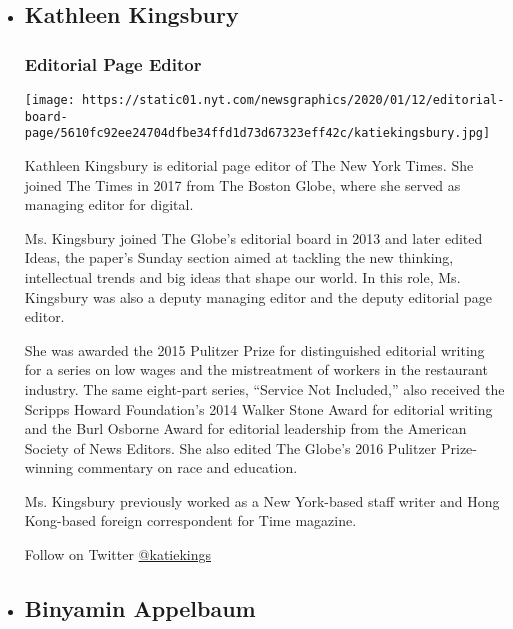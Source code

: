 \begin{itemize}
\item
  \hypertarget{kathleen-kingsbury}{%
  \subsection{Kathleen Kingsbury}\label{kathleen-kingsbury}}

  \hypertarget{editorial-page-editor}{%
  \subsubsection{Editorial Page Editor}\label{editorial-page-editor}}

  \texttt{[image: https://static01.nyt.com/newsgraphics/2020/01/12/editorial-board-page/5610fc92ee24704dfbe34ffd1d73d67323eff42c/katiekingsbury.jpg]}

  Kathleen Kingsbury is editorial page editor of The New York Times. She
  joined The Times in 2017 from The Boston Globe, where she served as
  managing editor for digital.

  Ms. Kingsbury joined The Globe's editorial board in 2013 and later
  edited Ideas, the paper's Sunday section aimed at tackling the new
  thinking, intellectual trends and big ideas that shape our world. In
  this role, Ms. Kingsbury was also a deputy managing editor and the
  deputy editorial page editor.

  She was awarded the 2015 Pulitzer Prize for distinguished editorial
  writing for a series on low wages and the mistreatment of workers in
  the restaurant industry. The same eight-part series, ``Service Not
  Included,'' also received the Scripps Howard Foundation's 2014 Walker
  Stone Award for editorial writing and the Burl Osborne Award for
  editorial leadership from the American Society of News Editors. She
  also edited The Globe's 2016 Pulitzer Prize-winning commentary on race
  and education.

  Ms. Kingsbury previously worked as a New York-based staff writer and
  Hong Kong-based foreign correspondent for Time magazine.

  Follow on Twitter \href{http://twitter.com/katiekings}{@katiekings}
\item
  \hypertarget{binyamin-appelbaum}{%
  \subsection{Binyamin Appelbaum}\label{binyamin-appelbaum}}


\end{itemize}
